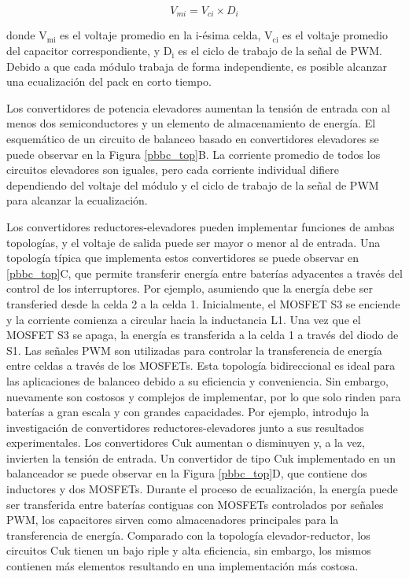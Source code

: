 \documentclass[10pt,a4paper]{article}
\begin{document}
\begin{equation}
    V_{mi} = V_{ci} \times D_i \label{pbbc_reduc_voltaje}
\end{equation}

donde $\mathrm{V_{mi}}$ es el voltaje promedio en la i-\'esima celda,
$\mathrm{V_{ci}}$ es el voltaje promedio del capacitor correspondiente, y
$\mathrm{D_i}$ es el ciclo de trabajo de la señal de \acrshort{PWM}. Debido a
que cada m\'odulo trabaja de forma independiente, es posible alcanzar una
ecualizaci\'on del pack en corto tiempo.

Los convertidores de potencia elevadores aumentan la tensi\'on de entrada con
al menos dos semiconductores y un elemento de almacenamiento de energ\'ia. El
esquem\'atico de un circuito de balanceo basado en convertidores elevadores se
puede observar en la Figura \ref{pbbc_top}B. La corriente promedio de todos los
circuitos elevadores son iguales, pero cada corriente individual difiere
dependiendo del voltaje del m\'odulo y el ciclo de trabajo de la señal de
\acrshort{PWM} para alcanzar la ecualizaci\'on.

Los convertidores reductores-elevadores pueden implementar funciones de ambas
topolog\'ias, y el voltaje de salida puede ser mayor o menor al de entrada. Una
topolog\'ia t\'ipica que implementa estos convertidores se puede observar en
\ref{pbbc_top}C, que permite transferir energ\'ia entre bater\'ias adyacentes a
trav\'es del control de los interruptores. Por ejemplo, asumiendo que la
energ\'ia debe ser transferied desde la celda 2 a la celda 1. Inicialmente, el
MOSFET S3 se enciende y la corriente comienza a circular hacia la inductancia
L1. Una vez que el MOSFET S3 se apaga, la energ\'ia es transferida a la celda 1
a trav\'es del diodo de S1. Las señales \acrshort{PWM} son utilizadas para
controlar la transferencia de energ\'ia entre celdas a trav\'es de los MOSFETs.
Esta topolog\'ia bidireccional es ideal para las aplicaciones de balanceo debido
a su eficiencia y conveniencia. Sin embargo, nuevamente son costosos y complejos
de implementar, por lo que solo rinden para bater\'ias a gran escala y con
grandes capacidades. Por ejemplo, \cite{shang_et_al_bal_rect} introdujo la 
investigaci\'on de convertidores reductores-elevadores junto a sus resultados 
experimentales.
Los convertidores Cuk aumentan o disminuyen y, a la vez, invierten la tensi\'on
de entrada. Un convertidor de tipo Cuk implementado en un balanceador se puede
observar en la Figura \ref{pbbc_top}D, que contiene dos inductores y dos
MOSFETs. Durante el proceso de ecualizaci\'on, la energ\'ia puede ser
transferida entre bater\'ias contiguas con MOSFETs controlados por señales
\acrshort{PWM}, los capacitores sirven como almacenadores principales para la
transferencia de energ\'ia. Comparado con la topolog\'ia elevador-reductor, los
circuitos Cuk tienen un bajo riple y alta eficiencia, sin embargo, los mismos
contienen m\'as elementos resultando en una implementaci\'on m\'as costosa.
\end{document}
